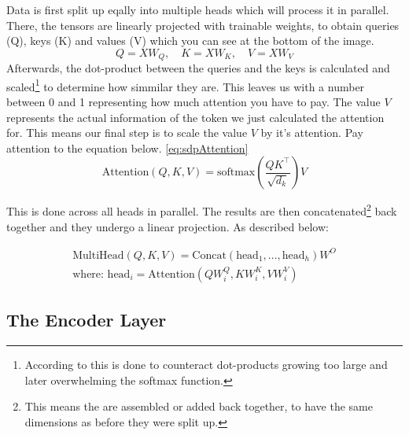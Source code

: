 \documentclass{article}
\begin{document}
Data is first split up eqally into multiple heads which will process it in 
parallel. There, the tensors are linearly projected with trainable weights, 
to obtain queries (Q), keys (K) and values (V) which you can see at the bottom 
of the image.
$$
Q = X W_Q, \quad K = X W_K, \quad V = X W_V
$$
Afterwards, the dot-product between the queries and the keys is calculated and 
scaled\footnote{According to \cite{vaswani2023attentionneed} this is done to 
counteract dot-products growing too large and later overwhelming the softmax 
function.} to determine how simmilar they are. This leaves us with a 
number between 0 and 1 representing how much attention you have to pay. The 
value $V$ represents the actual information of the token we just calculated the 
attention for. This means our final step is to scale the value $V$ by it's 
attention. Pay attention to the equation below. \eqref{eq:sdpAttention}
\begin{equation}
    \text{Attention}(Q, K, V) = \text{softmax}\left( \frac{Q K^\top}{\sqrt{d_k}} \right) V \label{eq:sdpAttention}
\end{equation}

This is done across all heads in parallel. The results are then concatenated\footnote{
This means the are assembled or added back together, to have the same 
dimensions as before they were split up.} back together and they undergo 
a linear projection. As described below:

\begin{gather*}
\text{MultiHead}(Q, K, V) = \text{Concat}(\text{head}_1, ..., \text{head}_h) W^O \\
\text{where: } \text{head}_i = \text{Attention}(Q W_i^Q, K W_i^K, V W_i^V)
\end{gather*}

\newpage
\subsection{The Encoder Layer}
\end{document}

